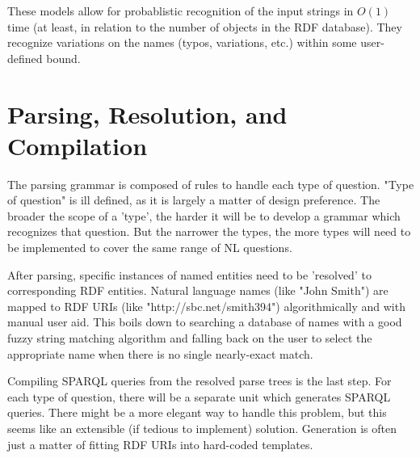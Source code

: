 \documentclass[11pt]{article}
\begin{document}
These models allow for probablistic recognition of the input strings in 
$O(1)$ time (at least, in relation to the number of objects in the RDF
database). They recognize variations on the names (typos, variations, etc.)
within some user-defined bound. 

\section{Parsing, Resolution, and Compilation}
The parsing grammar is composed of rules to handle each type of question.
"Type of question" is ill defined, as it is largely a matter of design preference.
The broader the scope of a 'type', the harder it will be to develop a grammar
which recognizes that question. But the narrower the types, the more types
will need to be implemented to cover the same range of NL questions.

After parsing, specific instances of named entities need to be 'resolved' to
corresponding RDF entities. Natural language names (like "John Smith") are mapped
to RDF URIs (like "http://sbc.net/smith394")
algorithmically and with manual user aid. This boils down to searching a
database of names with a good fuzzy string matching algorithm and falling
back on the user to select the appropriate name when there is no single nearly-exact
match.

Compiling SPARQL queries from the resolved parse trees is the last step.
For each type of question, there will be a separate unit which 
generates SPARQL queries. There might be a more elegant way to handle this
problem, but this seems like an extensible (if tedious to implement) solution.
Generation is often just a matter of fitting RDF URIs into hard-coded templates.

%
\end{document}
